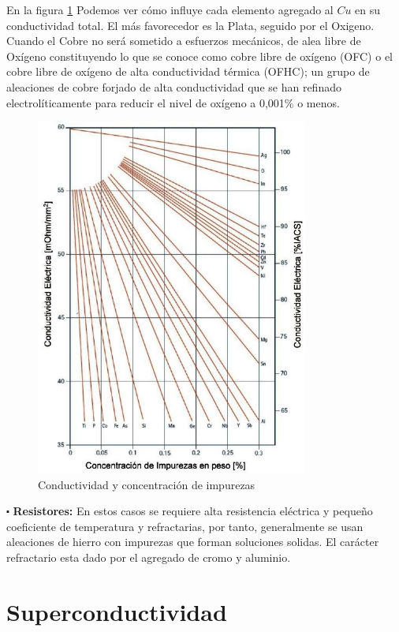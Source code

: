 En la figura \ref{fig:47} Podemos ver cómo influye cada elemento agregado al $Cu$ en su conductividad total. El más favorecedor es la Plata, seguido por el Oxigeno. Cuando el Cobre no será sometido a esfuerzos mecánicos, de alea libre de Oxígeno constituyendo lo que se conoce como cobre libre de oxígeno (OFC) o el cobre libre de oxígeno de alta conductividad térmica (OFHC); un grupo de aleaciones de cobre forjado de alta conductividad que se han refinado electrolíticamente para reducir el nivel de oxígeno a 0,001\% o menos.

\begin{figure}[H]
    \centering
    \includegraphics[width=0.8\textwidth]{./Figures/fig47}
	\caption{Conductividad y concentración de impurezas}
	\label{fig:47}
\end{figure}


$\centerdot$ \textbf{Resistores:}
En estos casos se requiere alta resistencia eléctrica y pequeño coeficiente de temperatura y refractarias, por tanto, generalmente se usan aleaciones de hierro con impurezas que forman soluciones solidas. El carácter refractario esta dado por el agregado de cromo y aluminio.


\section{Superconductividad}

